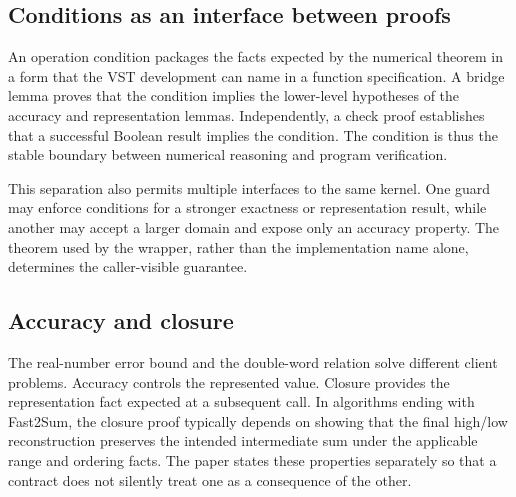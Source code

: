 \subsection{Conditions as an interface between proofs}

An operation condition packages the facts expected by the numerical theorem in
a form that the VST development can name in a function specification.  A bridge
lemma proves that the condition implies the lower-level hypotheses of the
accuracy and representation lemmas.  Independently, a check proof establishes
that a successful Boolean result implies the condition.  The condition is thus
the stable boundary between numerical reasoning and program verification.

This separation also permits multiple interfaces to the same kernel.  One
guard may enforce conditions for a stronger exactness or representation
result, while another may accept a larger domain and expose only an accuracy
property.  The theorem used by the wrapper, rather than the implementation name
alone, determines the caller-visible guarantee.

\subsection{Accuracy and closure}

The real-number error bound and the double-word relation solve different
client problems.  Accuracy controls the represented value.  Closure provides
the representation fact expected at a subsequent call.  In algorithms ending
with Fast2Sum, the closure proof typically depends on showing that the final
high/low reconstruction preserves the intended intermediate sum under the
applicable range and ordering facts.  The paper states these properties
separately so that a contract does not silently treat one as a consequence of
the other.
